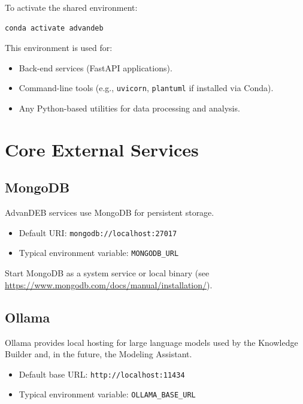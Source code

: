 \documentclass[11pt]{article}
\begin{document}
To activate the shared environment:

\begin{verbatim}
conda activate advandeb
\end{verbatim}

This environment is used for:

\begin{itemize}[noitemsep]
  \item Back-end services (FastAPI applications).
  \item Command-line tools (e.g., \texttt{uvicorn}, \texttt{plantuml} if installed via Conda).
  \item Any Python-based utilities for data processing and analysis.
\end{itemize}

\section{Core External Services}

\subsection{MongoDB}

AdvanDEB services use MongoDB for persistent storage.

\begin{itemize}[noitemsep]
  \item Default URI: \texttt{mongodb://localhost:27017}
  \item Typical environment variable: \texttt{MONGODB\_URL}
\end{itemize}

Start MongoDB as a system service or local binary (see \url{https://www.mongodb.com/docs/manual/installation/}).

\subsection{Ollama}

Ollama provides local hosting for large language models used by the Knowledge Builder and, in the future, the Modeling Assistant.

\begin{itemize}[noitemsep]
  \item Default base URL: \texttt{http://localhost:11434}
  \item Typical environment variable: \texttt{OLLAMA\_BASE\_URL}
\end{itemize}
\end{document}
